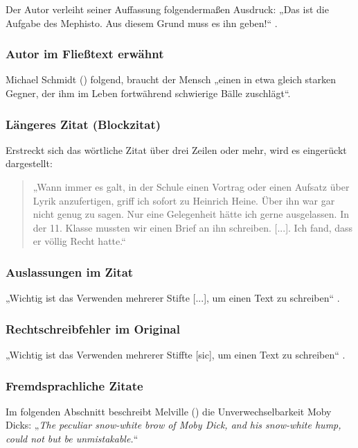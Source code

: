\documentclass[12pt,a4paper]{article}
\begin{document}
Der Autor verleiht seiner Auffassung folgendermaßen Ausdruck: „Das ist die Aufgabe des Mephisto. Aus diesem Grund muss es ihn geben!“ \parencite[][S. 102]{Schmidt2004}.

\subsubsection{Autor im Fließtext erwähnt}

Michael Schmidt (\citeyear[102]{Schmidt2004}) folgend, braucht der Mensch „einen in etwa gleich starken Gegner, der ihm im Leben fortwährend schwierige Bälle zuschlägt“.

\subsubsection{Längeres Zitat (Blockzitat)}

Erstreckt sich das wörtliche Zitat über drei Zeilen oder mehr, wird es eingerückt dargestellt:

\begin{quote}
„Wann immer es galt, in der Schule einen Vortrag oder einen Aufsatz über Lyrik anzufertigen, griff ich sofort zu Heinrich Heine. Über ihn war gar nicht genug zu sagen. Nur eine Gelegenheit hätte ich gerne ausgelassen. In der 11. Klasse mussten wir einen Brief an ihn schreiben. [...]. Ich fand, dass er völlig Recht hatte.“ \parencite[][S. 120]{Rusch2003}
\end{quote}

\subsubsection{Auslassungen im Zitat}

„Wichtig ist das Verwenden mehrerer Stifte [...], um einen Text zu schreiben“ \parencite[][S. 45]{Mueller2019}.

\subsubsection{Rechtschreibfehler im Original}

„Wichtig ist das Verwenden mehrerer Stiffte [sic], um einen Text zu schreiben“ \parencite[][S. 45]{Mueller2019}.

\subsubsection{Fremdsprachliche Zitate}

Im folgenden Abschnitt beschreibt Melville (\citeyear[201]{Melville1994}) die Unverwechselbarkeit Moby Dicks: „\textit{The peculiar snow-white brow of Moby Dick, and his snow-white hump, could not but be unmistakable.}“
\end{document}
